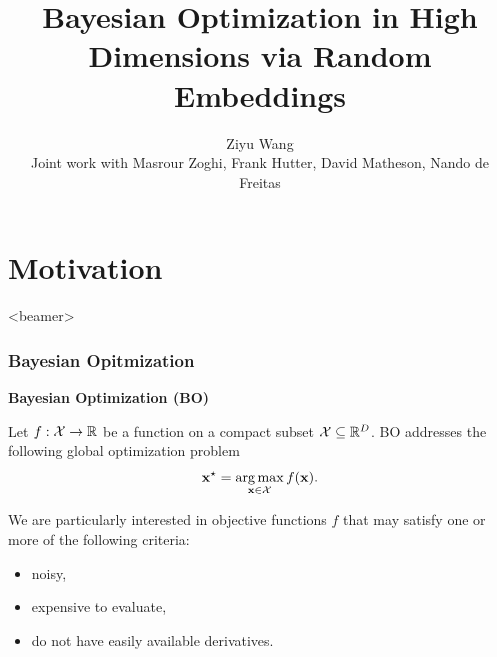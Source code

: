 \documentclass[grey]{beamer}
\title{Bayesian Optimization in High Dimensions via Random Embeddings}
\author[Ziyu Wang]{Ziyu Wang\\ [3mm]Joint work with Masrour Zoghi, Frank Hutter, 
David Matheson, Nando de Freitas}
\date{}                    %
\DeclareMathOperator*{\argmax}{arg\,max}
\begin{document}
\begin{frame}
  \titlepage
\end{frame}

\section[Outline]{}

\begin{frame}
  \tableofcontents
\end{frame}


\section{Motivation}
\label{sec:ahmc}
\begin{frame}<beamer>
 \tableofcontents[currentsection]
\end{frame}

\begin{frame}
 \frametitle{Bayesian Opitmization}
 {\bf \textcolor{myColor}{Bayesian Optimization (BO)}}

 Let $f: {\cal X} \to \mathbb{R}$ be a function on a compact subset 
 ${\cal X} \subseteq \mathbb{R}^D$. 
 BO addresses the following global optimization problem
 \[ \vx^{\star} = \argmax_{\vx \in {\cal X}} f(\vx). \]

 We are particularly interested in objective functions $f$ 
 that may satisfy one or more of the following criteria: 
 \begin{itemize}
  \item noisy,
  \item expensive to evaluate,
  \item do not have easily available derivatives.
 \end{itemize}
\end{frame}
\end{document}
